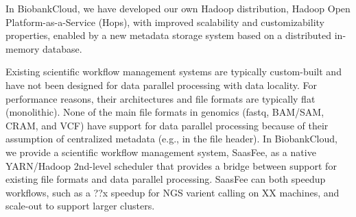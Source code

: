 In BiobankCloud, we have developed our own Hadoop distribution, Hadoop Open Platform-as-a-Service (Hops), with improved scalability and customizability properties, enabled by a new metadata storage system based on a distributed in-memory database.

Existing scientific workflow management systems are typically custom-built and have not been designed for data parallel processing with data locality. For performance reasons, their architectures and file formats are typically flat (monolithic). None of the main file formats in genomics (fastq, BAM/SAM, CRAM, and VCF) have support for data parallel processing because of their assumption of centralized metadata (e.g., in the file header). 
In BiobankCloud, we provide a scientific workflow management system, SaasFee, as a native YARN/Hadoop 2nd-level scheduler that provides a bridge between support for existing file formats and data parallel processing. SaasFee can both speedup workflows, such as a ??x speedup for NGS varient calling on XX machines, and scale-out to support larger clusters.